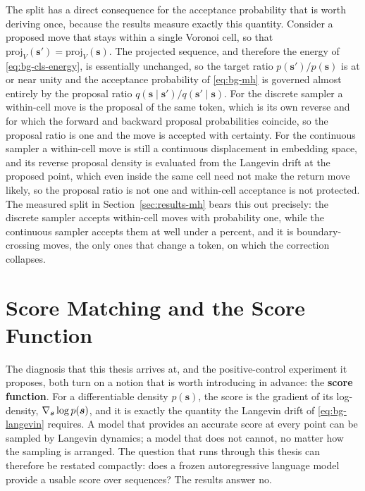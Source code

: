 The split has a direct consequence for the acceptance probability that is worth deriving once, because the results measure exactly this quantity. Consider a proposed move that stays within a single Voronoi cell, so that $\mathrm{proj}_V(\bm{s}') = \mathrm{proj}_V(\bm{s})$. The projected sequence, and therefore the energy of \eqref{eq:bg-cls-energy}, is essentially unchanged, so the target ratio $p(\bm{s}')/p(\bm{s})$ is at or near unity and the acceptance probability of \eqref{eq:bg-mh} is governed almost entirely by the proposal ratio $q(\bm{s}\mid\bm{s}')/q(\bm{s}'\mid\bm{s})$. For the discrete sampler a within-cell move is the proposal of the same token, which is its own reverse and for which the forward and backward proposal probabilities coincide, so the proposal ratio is one and the move is accepted with certainty. For the continuous sampler a within-cell move is still a continuous displacement in embedding space, and its reverse proposal density is evaluated from the Langevin drift at the proposed point, which even inside the same cell need not make the return move likely, so the proposal ratio is not one and within-cell acceptance is not protected. The measured split in Section~\ref{sec:results-mh} bears this out precisely: the discrete sampler accepts within-cell moves with probability one, while the continuous sampler accepts them at well under a percent, and it is boundary-crossing moves, the only ones that change a token, on which the correction collapses.

\section{Score Matching and the Score Function}
\label{sec:bg-score}

The diagnosis that this thesis arrives at, and the positive-control experiment it proposes, both turn on a notion that is worth introducing in advance: the \textbf{score function}. For a differentiable density $p(\bm{s})$, the score is the gradient of its log-density, $\nabla_{\bm{s}} \log p(\bm{s})$, and it is exactly the quantity the Langevin drift of \eqref{eq:bg-langevin} requires. A model that provides an accurate score at every point can be sampled by Langevin dynamics; a model that does not cannot, no matter how the sampling is arranged. The question that runs through this thesis can therefore be restated compactly: does a frozen autoregressive language model provide a usable score over sequences? The results answer no.

